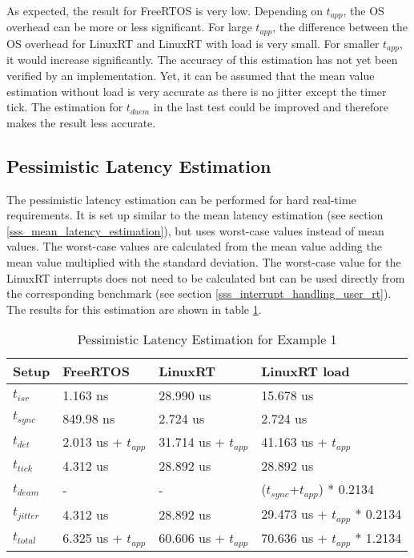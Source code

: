 As expected, the result for FreeRTOS is very low. 
Depending on $t_{app}$, the \ac{OS} overhead can be more or less significant. 
For large $t_{app}$, the difference between the \ac{OS} overhead for LinuxRT and LinuxRT with load is very small. 
For smaller $t_{app}$, it would increase significantly. 
The accuracy of this estimation has not yet been verified by an implementation.
Yet, it can be assumed that the mean value estimation without load is very accurate as there is no jitter except the timer tick.
The estimation for $t_{daem}$ in the last test could be improved and therefore makes the result less accurate.
   
\subsection{Pessimistic Latency Estimation}\label{sss_pessimistic_latency_estimation}
The pessimistic latency estimation can be performed for hard real-time requirements. 
It is set up similar to the mean latency estimation (see section \ref{sss_mean_latency_estimation}), but uses worst-case values instead of mean values. 
The worst-case values are calculated from the mean value adding the mean value multiplied with the standard deviation.
The worst-case value for the LinuxRT interrupts does not need to be calculated but can be used directly from the corresponding benchmark (see section \ref{sss_interrupt_handling_user_rt}). 
The results for this estimation are shown in table \ref{tab_example1_pessimistic}.  
 \begin{table}[htbp!]
	\centering
		\begin{tabular}{|l|l|l|l|}
			\hline
				Setup					& FreeRTOS 								& LinuxRT 							& LinuxRT load  \\
				\hline 
				$t_{isr}$ 		& 1.163 ns 								& 28.990 us 						& 15.678 us			\\
			  $t_{sync}$		& 849.98 ns	  						& 2.724 us 				 			& 2.724 us			\\
			  \hline 
			  $t_{det}$			& 2.013 us + $t_{app}$		& 31.714 us + $t_{app}$	& 41.163 us	+ $t_{app}$		\\ 
			  \hline
			  \hline
			  $t_{tick}$		& 4.312 us								& 28.892 us 					  & 28.892 us											\\
			  $t_{deam}$		& -				  							& - 				 						& ($t_{sync}$+$t_{app}$) * 0.2134	\\ 
				\hline 
			  $t_{jitter}$	& 4.312 us  							& 28.892 us						  & 29.473 us	+ $t_{app}$ * 0.2134	\\ 
			  \hline
			  \hline 
			  $t_{total}$		& 6.325 us + $t_{app}$	 & 60.606 us + $t_{app}$  &	70.636 us + $t_{app}$ * 1.2134 	\\ 
			\hline
		\end{tabular}
	\caption{Pessimistic Latency Estimation for Example 1}
	\label{tab_example1_pessimistic}
\end{table}

